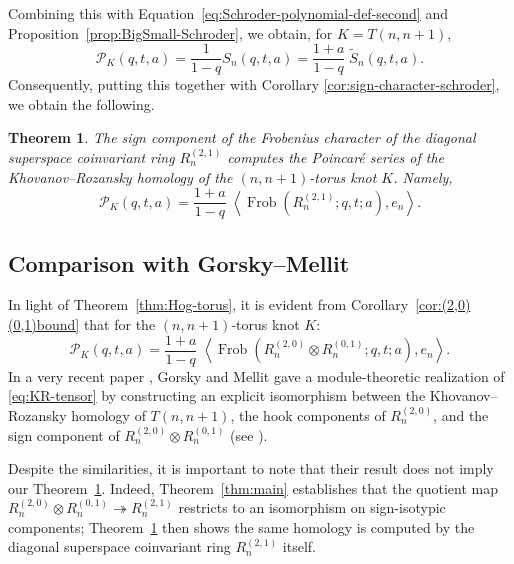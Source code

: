 \documentclass[11pt, noadjust, reqno]{amsart}
\newtheorem{theorem}{Theorem}[section]
\theoremstyle{definition}
\theoremstyle{remark}
\numberwithin{equation}{section}
\newcommand{\0}{\emptyset}
\DeclareMathOperator{\Frob}{Frob}
\begin{document}
Combining this with Equation~\eqref{eq:Schroder-polynomial-def-second} and Proposition~\ref{prop:BigSmall-Schroder}, we obtain, for $K = T(n,n+1)$,
\begin{equation*}
\mathcal{P}_K(q,t,a) 
= \frac{1}{1-q} 
S_{n}(q,t,a) = \frac{1+a}{1-q} \; 
\widetilde{S}_{n}(q,t,a).
\end{equation*}
Consequently, putting this together with Corollary \ref{cor:sign-character-schroder}, we obtain the following. 

\begin{theorem}\label{thm:torusknot} 
The sign component of the Frobenius character of the diagonal superspace coinvariant ring $R_n^{(2,1)}$ computes the Poincar\'e series of the Khovanov--Rozansky homology of the $(n,n+1)$-torus knot $K$. Namely, 
  \begin{equation*}\label{eq:KR-(2,1)}
  \mathcal{P}_K(q,t,a) = \frac{1+a}{1-q} \; 
\left\langle \Frob(R_n^{(2,1)}; q,t;a), e_n \right\rangle . 
\end{equation*}
\end{theorem}

\subsection{Comparison with Gorsky--Mellit} 
In light of Theorem~\ref{thm:Hog-torus}, it is evident from Corollary~\ref{cor:(2,0)(0,1)bound} that for the $(n,n+1)$-torus knot $K$:
\begin{equation} \label{eq:KR-tensor}
\mathcal{P}_K(q,t,a) = \frac{1+a}{1-q} \; 
\left\langle \Frob(R_n^{(2,0)} \otimes R_n^{(0,1)}; q,t;a), e_n \right\rangle. 
\end{equation}
In a very recent paper \cite{GorskyMellit}, Gorsky and Mellit gave a module-theoretic realization of \eqref{eq:KR-tensor} by constructing an explicit isomorphism between the Khovanov--Rozansky homology of $T(n,n+1)$, the hook components of $R_n^{(2,0)}$, and the sign component of $R_n^{(2,0)} \otimes R_n^{(0,1)}$ (see \cite[Section 3.3]{GorskyMellit}). 

Despite the similarities, it is important to note that their result does not imply our Theorem~\ref{thm:torusknot}. 
Indeed, Theorem~\ref{thm:main} establishes that the quotient map $R_n^{(2,0)} \otimes R_n^{(0,1)} \twoheadrightarrow R_n^{(2,1)}$ restricts to an isomorphism on sign-isotypic components; Theorem~\ref{thm:torusknot} then shows the same homology is computed by the diagonal superspace coinvariant ring $R_n^{(2,1)}$ itself.
\end{document}
